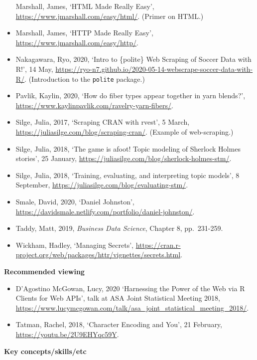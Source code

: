 \documentclass[
]{book}
\providecommand{\tightlist}{%
  \setlength{\itemsep}{0pt}\setlength{\parskip}{0pt}}
\begin{document}
\begin{itemize}
  Marshall, James, `HTML Made Really Easy', \url{https://www.jmarshall.com/easy/html/}. (Primer on HTML.)
\item
  Marshall, James, `HTTP Made Really Easy', \url{https://www.jmarshall.com/easy/http/}.
\item
  Nakagawara, Ryo, 2020, `Intro to \{polite\} Web Scraping of Soccer Data with R!', 14 May, \url{https://ryo-n7.github.io/2020-05-14-webscrape-soccer-data-with-R/}. (Introduction to the \texttt{polite} package.)
\item
  Pavlik, Kaylin, 2020, `How do fiber types appear together in yarn blends?', \url{https://www.kaylinpavlik.com/ravelry-yarn-fibers/}.
\item
  Silge, Julia, 2017, `Scraping CRAN with rvest', 5 March, \url{https://juliasilge.com/blog/scraping-cran/}. (Example of web-scraping.)
\item
  Silge, Julia, 2018, `The game is afoot! Topic modeling of Sherlock Holmes stories', 25 January, \url{https://juliasilge.com/blog/sherlock-holmes-stm/}.
\item
  Silge, Julia, 2018, `Training, evaluating, and interpreting topic models', 8 September, \url{https://juliasilge.com/blog/evaluating-stm/}.
\item
  Smale, David, 2020, `Daniel Johnston', \url{https://davidsmale.netlify.com/portfolio/daniel-johnston/}.
\item
  Taddy, Matt, 2019, \emph{Business Data Science}, Chapter 8, pp.~231-259.
\item
  Wickham, Hadley, `Managing Secrets', \url{https://cran.r-project.org/web/packages/httr/vignettes/secrets.html}.
\end{itemize}

\textbf{Recommended viewing}

\begin{itemize}
\tightlist
\item
  D'Agostino McGowan, Lucy, 2020 `Harnessing the Power of the Web via R Clients for Web APIs', talk at ASA Joint Statistical Meeting 2018, \url{https://www.lucymcgowan.com/talk/asa_joint_statistical_meeting_2018/}.
\item
  Tatman, Rachel, 2018, `Character Encoding and You', 21 February, \url{https://youtu.be/2U9EHYqc59Y}.
\end{itemize}

\textbf{Key concepts/skills/etc}
\end{document}
